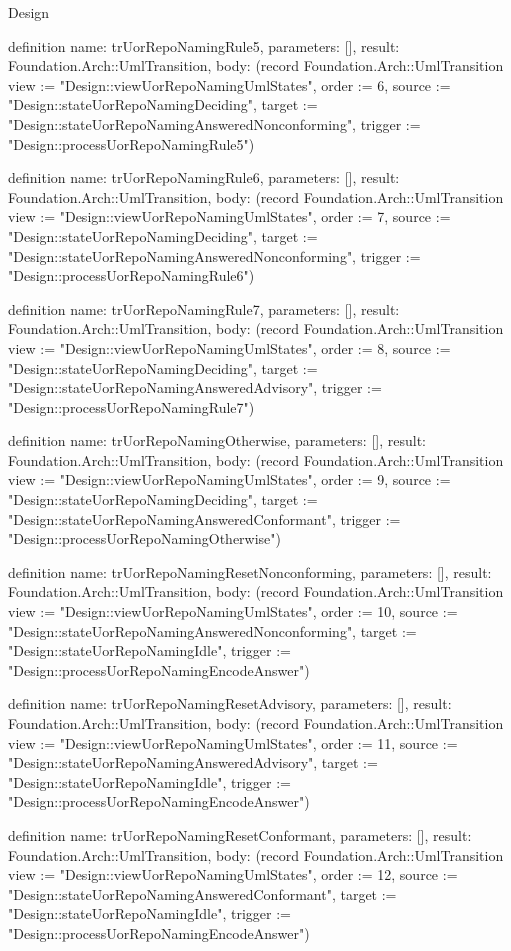 \begin{lexlean}{Design}
\begin{semanticmodule}
definition{
  name: trUorRepoNamingRule5,
  parameters: [],
  result: Foundation.Arch::UmlTransition,
  body: (record Foundation.Arch::UmlTransition {view := "Design::viewUorRepoNamingUmlStates", order := 6, source := "Design::stateUorRepoNamingDeciding", target := "Design::stateUorRepoNamingAnsweredNonconforming", trigger := "Design::processUorRepoNamingRule5"})
}

definition{
  name: trUorRepoNamingRule6,
  parameters: [],
  result: Foundation.Arch::UmlTransition,
  body: (record Foundation.Arch::UmlTransition {view := "Design::viewUorRepoNamingUmlStates", order := 7, source := "Design::stateUorRepoNamingDeciding", target := "Design::stateUorRepoNamingAnsweredNonconforming", trigger := "Design::processUorRepoNamingRule6"})
}

definition{
  name: trUorRepoNamingRule7,
  parameters: [],
  result: Foundation.Arch::UmlTransition,
  body: (record Foundation.Arch::UmlTransition {view := "Design::viewUorRepoNamingUmlStates", order := 8, source := "Design::stateUorRepoNamingDeciding", target := "Design::stateUorRepoNamingAnsweredAdvisory", trigger := "Design::processUorRepoNamingRule7"})
}

definition{
  name: trUorRepoNamingOtherwise,
  parameters: [],
  result: Foundation.Arch::UmlTransition,
  body: (record Foundation.Arch::UmlTransition {view := "Design::viewUorRepoNamingUmlStates", order := 9, source := "Design::stateUorRepoNamingDeciding", target := "Design::stateUorRepoNamingAnsweredConformant", trigger := "Design::processUorRepoNamingOtherwise"})
}

definition{
  name: trUorRepoNamingResetNonconforming,
  parameters: [],
  result: Foundation.Arch::UmlTransition,
  body: (record Foundation.Arch::UmlTransition {view := "Design::viewUorRepoNamingUmlStates", order := 10, source := "Design::stateUorRepoNamingAnsweredNonconforming", target := "Design::stateUorRepoNamingIdle", trigger := "Design::processUorRepoNamingEncodeAnswer"})
}

definition{
  name: trUorRepoNamingResetAdvisory,
  parameters: [],
  result: Foundation.Arch::UmlTransition,
  body: (record Foundation.Arch::UmlTransition {view := "Design::viewUorRepoNamingUmlStates", order := 11, source := "Design::stateUorRepoNamingAnsweredAdvisory", target := "Design::stateUorRepoNamingIdle", trigger := "Design::processUorRepoNamingEncodeAnswer"})
}

definition{
  name: trUorRepoNamingResetConformant,
  parameters: [],
  result: Foundation.Arch::UmlTransition,
  body: (record Foundation.Arch::UmlTransition {view := "Design::viewUorRepoNamingUmlStates", order := 12, source := "Design::stateUorRepoNamingAnsweredConformant", target := "Design::stateUorRepoNamingIdle", trigger := "Design::processUorRepoNamingEncodeAnswer"})
}


\end{semanticmodule}
\end{lexlean}
